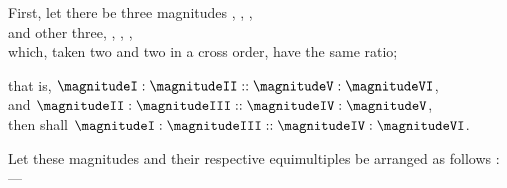 \documentclass[booklanguage=english]{byrnebook}
\begin{document}
\begin{center}
First, let there be three magnitudes , , ,\\
and other three, , , ,\\
which, taken two and two in a cross order, have the same ratio;

that is, $\magnitudeI : \magnitudeII :: \magnitudeV : \magnitudeVI$,\\
and $\magnitudeII : \magnitudeIII :: \magnitudeIV : \magnitudeV$,\\
then shall $\magnitudeI : \magnitudeIII :: \magnitudeIV : \magnitudeVI$.
\end{center}

Let these magnitudes and their respective equimultiples be arranged as follows :—
\end{document}
